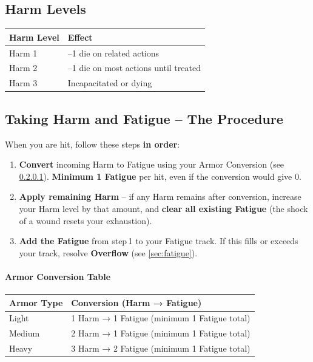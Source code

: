 \subsection{Harm Levels}
\label{sec:harm}
\begin{center}
\begin{tabular}{ll}
\toprule
\textbf{Harm Level} & \textbf{Effect} \\
\midrule
Harm 1 & –1 die on related actions \\
Harm 2 & –1 die on most actions until treated \\
Harm 3 & Incapacitated or dying \\
\bottomrule
\end{tabular}
\end{center}

\subsection{Taking Harm and Fatigue – The Procedure}
\label{sec:take-harm-fatigue}
When you are hit, follow these steps \textbf{in order}:

\begin{enumerate}
  \item \textbf{Convert} incoming Harm to Fatigue using your Armor Conversion (see \ref{sec:armor}).  
        \textbf{Minimum 1 Fatigue} per hit, even if the conversion would give 0.
  \item \textbf{Apply remaining Harm} – if any Harm remains after conversion, increase your Harm level by that amount, and \textbf{clear all existing Fatigue} (the shock of a wound resets your exhaustion).
  \item \textbf{Add the Fatigue} from step 1 to your Fatigue track. If this fills or exceeds your track, resolve \textbf{Overflow} (see \ref{sec:fatigue}).
\end{enumerate}

\paragraph{Armor Conversion Table}
\label{sec:armor}
\begin{center}
\begin{tabular}{ll}
\toprule
\textbf{Armor Type} & \textbf{Conversion (Harm → Fatigue)} \\
\midrule
Light  & 1 Harm → 1 Fatigue (minimum 1 Fatigue total) \\
Medium & 2 Harm → 1 Fatigue (minimum 1 Fatigue total) \\
Heavy  & 3 Harm → 2 Fatigue (minimum 1 Fatigue total) \\
\bottomrule
\end{tabular}
\end{center}

